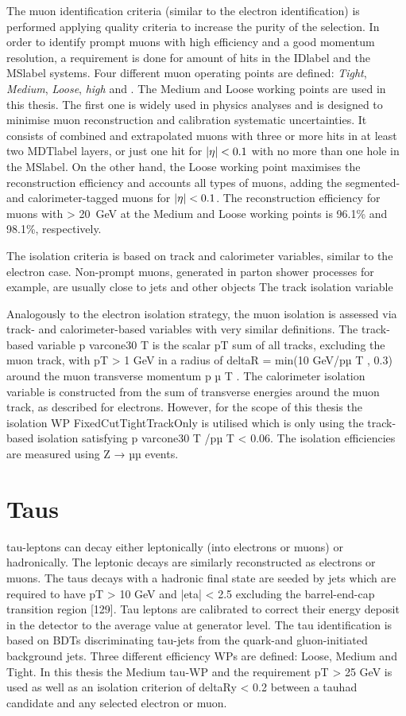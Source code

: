 The muon identification criteria (similar to the electron identification) is performed applying quality criteria to increase the purity of the selection. In order to identify prompt muons with high efficiency and a
good momentum resolution, a requirement is done for amount of hits in the \acrshort{IDlabel} and the \acrshort{MSlabel} systems. Four different muon operating points are defined: \textit{Tight}, \textit{Medium}, \textit{Loose}, \textit{high \pT} and . The Medium and Loose working points are used in this thesis. The first one is widely used in physics analyses and is designed to minimise muon reconstruction and calibration systematic uncertainties. It consists of combined and extrapolated muons with three or more hits in at least two \acrshort{MDTlabel} layers, or just one hit for $\abs{\eta}<0.1$ with no more than one hole in the \acrshort{MSlabel}. On the other hand, the Loose working point maximises the reconstruction efficiency and accounts all types of muons, adding the segmented- and calorimeter-tagged muons for $\abs{\eta}<0.1$. The reconstruction efficiency for muons with \pT > 20~GeV at the Medium and Loose working points is 96.1\% and 98.1\%, respectively.

The isolation criteria is based on track and calorimeter variables, similar to the electron case. Non-prompt muons, generated in parton shower processes for example, are usually close to jets and other objects The track isolation variable 

Analogously to the electron isolation strategy, the muon isolation is assessed via track- and calorimeter-based variables with very similar definitions. The track-based variable p
varcone30
T
is the scalar pT sum
of all tracks, excluding the muon track, with pT > 1 GeV in a radius of deltaR = min(10 GeV/pµ
T
, 0.3)
around the muon transverse momentum p
µ
T
. The calorimeter isolation variable is constructed from
the sum of transverse energies around the muon track, as described for electrons. However, for the
scope of this thesis the isolation WP FixedCutTightTrackOnly is utilised which is only using the
track-based isolation satisfying p
varcone30
T
/pµ
T < 0.06. The isolation efficiencies are measured using
Z → µµ events.

\section{Taus}

tau-leptons can decay either leptonically (into electrons or muons) or hadronically. The leptonic decays
are similarly reconstructed as electrons or muons. The taus decays with a hadronic final state are seeded
by jets which are required to have pT > 10 GeV and |eta| < 2.5 excluding the barrel-end-cap transition
region [129]. Tau leptons are calibrated to correct their energy deposit in the detector to the average
value at generator level. The tau identification is based on BDTs discriminating tau-jets from the quark-and gluon-initiated background jets. Three different efficiency WPs are defined: Loose, Medium
and Tight. In this thesis the Medium tau-WP and the requirement pT > 25 GeV is used as well as an
isolation criterion of deltaRy < 0.2 between a tauhad candidate and any selected electron or muon.

